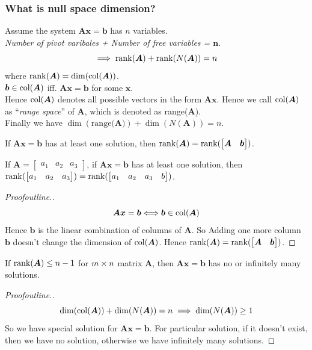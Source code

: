 \subsubsection{What is null space dimension?}
Assume the system $\bm{Ax}=\bm b$ has $n$ variables.\\
\emph{Number of pivot varibales + Number of free variables = $\bm n$}.
\[
\implies \operatorname{rank}(\bm A) + \operatorname{rank}(N(\bm A)) = n
\]
where $\operatorname{rank}(\bm A) = \dim(\operatorname{col}(\bm A))$.\\
$\bm b\in\operatorname{col}(\bm A)$ iff. $\bm{Ax} = \bm b$ for some $\bm x$.\\
Hence $\operatorname{col}(\bm A)$ denotes all possible vectors in the form $\bm{Ax}$. Hence we call $\operatorname{col}(\bm A)$ as ``\emph{range space}'' of $\bm A$, which is denoted as range($\bm A$).\\
Finally we have $\dim(\text{range($\bm A$)}) + \dim(N(\bm A)) = n$.
\begin{proposition}
If $\bm{Ax} = \bm b$ has at least one solution, then $\operatorname{rank}(\bm A) = \operatorname{rank}(\begin{bmatrix}
\bm A&\bm b
\end{bmatrix})$.
\end{proposition}
\begin{example}
If $\bm A = \begin{bmatrix}
a_1&a_2&a_3
\end{bmatrix}$, if $\bm{Ax} = \bm b$ has at least one solution, then $\operatorname{rank}(\begin{bmatrix}
a_1&a_2&a_3
\end{bmatrix}) = \operatorname{rank}(\begin{bmatrix}
a_1&a_2&a_3&b
\end{bmatrix})$.
\end{example}
\begin{proof}[Proofoutline.]
\[
\bm{Ax} = \bm b\Longleftrightarrow \bm b\in\operatorname{col}(\bm A)
\]
Hence $\bm b$ is the linear combination of columns of $\bm A$. So Adding one more column $\bm b$ doesn't change the dimension of $\operatorname{col}(\bm A)$. Hence $\operatorname{rank}(\bm A) = \operatorname{rank}(\begin{bmatrix}
\bm A&\bm b
\end{bmatrix})$.
\end{proof}
\begin{proposition}
If $\operatorname{rank}(\bm A)\le n-1$ for $m\times n$ matrix $\bm A$, then $\bm{Ax} = \bm b$ has no or infinitely many solutions.
\end{proposition}
\begin{proof}[Proofoutline.]
\[
\dim(\operatorname{col}(\bm A))+\dim(N(\bm A)) = n
\implies \dim(N(\bm A))\ge 1
\]
So we have special solution for $\bm{Ax} = \bm b$. For particular solution, if it doesn't exist, then we have no solution, otherwise we have infinitely many solutions.
\end{proof}
